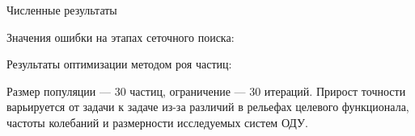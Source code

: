 \begin{frame}{Численные результаты}
	\vfill
	\renewcommand{\arraystretch}{1.25} %
	
	Значения ошибки на этапах сеточного поиска:
	\vspace{-10pt} %
	\fontsize{7pt}{8pt}\selectfont %
	
	\normalsize
	
	Результаты оптимизации методом роя частиц:
	\vspace{-10pt} %
	\fontsize{7pt}{8pt}\selectfont %
	
	
	\vspace{0.15cm}
	
	{\footnotesize \raggedright Размер популяции — 30 частиц, ограничение — 30 итераций. Прирост точности варьируется от задачи к задаче из-за различий в рельефах целевого функционала, частоты колебаний и размерности исследуемых систем ОДУ.\par}
	
	\vfill %
\end{frame}